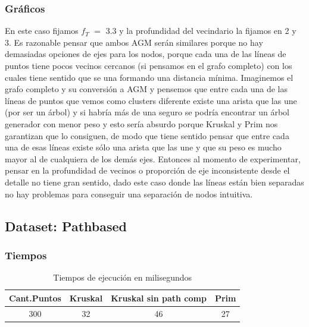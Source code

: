 \documentclass[11pt,a4paper]{article}
\begin{document}
\subsubsection{Gráficos}
En este caso fijamos $f_{T}$ $=$ 3.3 y la profundidad del vecindario la fijamos en 2 y 3. Es razonable pensar que ambos AGM serán similares porque no hay demasiadas opciones de ejes para los nodos, porque cada una de las líneas de puntos tiene pocos vecinos cercanos (si pensamos en el grafo completo) con los cuales tiene sentido que se una formando una distancia mínima. Imaginemos el grafo completo y su conversión a AGM y pensemos que entre cada una de las líneas de puntos que vemos como clusters diferente existe una arista que las une (por ser un árbol) y si habría más de una seguro se podría encontrar un árbol generador con menor peso y esto sería absurdo porque Kruskal y Prim nos garantizan que lo consiguen, de modo que tiene sentido pensar que entre cada una de esas líneas existe sólo una arista que las une y que su peso es mucho mayor al de cualquiera de los demás ejes. Entonces al momento de experimentar, pensar en la profundidad de vecinos o proporción de eje inconsistente desde el detalle no tiene gran sentido, dado este caso donde las líneas están bien separadas no hay problemas para conseguir una separación de nodos intuitiva. \\


\subsection{Dataset: Pathbased}

\subsubsection{Tiempos}
\begin{table}[ht]
\caption{Tiempos de ejecución en milisegundos} %
\centering %
\begin{tabular}{c c c c} %
\hline\hline %
Cant.Puntos & Kruskal & Kruskal sin path comp & Prim \\ [0.5ex] %
\hline %
300 & 32 & 46 & 27 \\ [1ex] %
\hline %
\end{tabular}
\label{table:nonlin} %
\end{table} 
\end{document}
